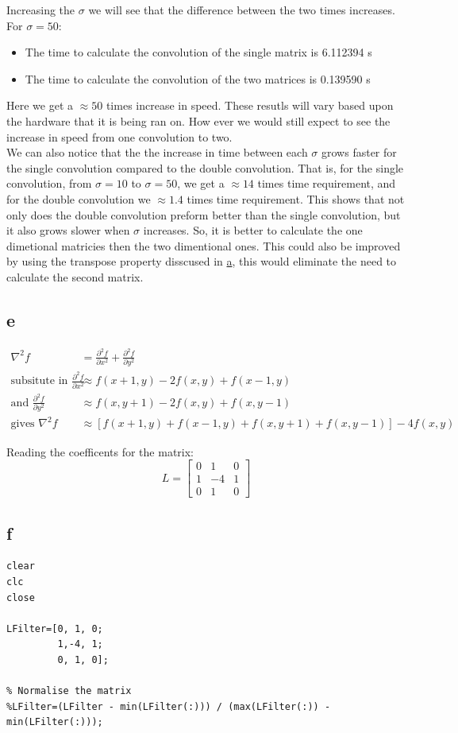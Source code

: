 \documentclass[11pt]{article}
\begin{document}
Increasing the \(\sigma\) we will see that the difference between the two times increases. For \(\sigma=50\):
\begin{itemize}
\item The time to calculate the convolution of the single matrix is 6.112394 s
\item The time to calculate the convolution of the two matrices is 0.139590 s
\end{itemize}
Here we get a \(\approx 50\) times increase in speed. These resutls will vary based upon the hardware that it is being ran on. How ever we would still expect to see the increase in speed from one convolution to two.\\
We can also notice that the the increase in time between each \(\sigma\) grows faster for the single convolution compared to the double convolution. That is, for the single convolution, from \(\sigma=10\) to \(\sigma=50\), we get a \(\approx 14\) times time requirement, and for the double convolution we \(\approx 1.4\) times time requirement. This shows that not only does the double convolution preform better than the single convolution, but it also grows slower when \(\sigma\) increases. So, it is better to calculate the one dimetional matricies then the two dimentional ones. This could also be improved by using the transpose property disscused in \hyperref[sec:org2a74310]{a}, this would eliminate the need to calculate the second matrix.
\subsection{e}
\label{sec:orgdaa51da}
\begin{align*}
\nabla^{2}f &= \frac{\partial^2 f}{\partial x^2}+ \frac{\partial^2 f}{\partial y^2} \\
\textrm{subsitute in } \frac{\partial^2 f}{\partial x^2} &\approx f(x+1,y)-2f(x,y)+f(x-1,y) \\
\textrm{and } \frac{\partial^2 f}{\partial y^2} &\approx f(x,y+1)-2f(x,y)+f(x,y-1) \\
\textrm{gives }\nabla^{2}f & \approx \left[ f(x+1,y) + f(x-1,y) + f(x,y+1) + f(x,y-1)\right] - 4f(x,y)
\end{align*}

Reading the coefficents for the matrix:
\[L=\begin{bmatrix}
0 & 1  & 0 \\
1 & -4 & 1 \\
0 & 1  & 0
\end{bmatrix}\]
\subsection{f}
\label{sec:org160ed82}
\begin{verbatim}
clear
clc
close

LFilter=[0, 1, 0;
         1,-4, 1;
         0, 1, 0];

% Normalise the matrix
%LFilter=(LFilter - min(LFilter(:))) / (max(LFilter(:)) - min(LFilter(:)));
\end{verbatim}
\end{document}
